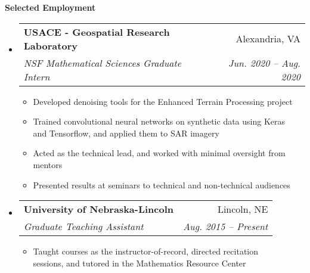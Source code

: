 \documentclass[letterpaper,11pt]{article}
\makeatletter
\newcommand{\resitem}[1]{\item #1 \vspace{-2pt}}
\newcommand{\resheading}[1]{{\large \colorbox{mygrey}{\begin{minipage}{\textwidth}{\textbf{#1 \vphantom{p\^{E}}}}\end{minipage}}}}
\newcommand{\ressubheading}[4]{
\begin{tabular*}{6.5in}{l@{\extracolsep{\fill}}r}
		\textbf{#1} & #2 \\
		\textit{#3} & \textit{#4} \\
\end{tabular*}\vspace{-6pt}}
\makeatother
\begin{document}
\resheading{Selected Employment}
	\begin{itemize}
				\item
		\ressubheading{USACE - Geospatial Research Laboratory}{Alexandria, VA}{NSF Mathematical Sciences Graduate Intern}{Jun. 2020 -- Aug. 2020}
		{\footnotesize
			\begin{itemize}
				\resitem{Developed denoising tools for the Enhanced Terrain Processing project}
				\resitem{Trained convolutional neural networks on synthetic data using Keras \\ and Tensorflow, and applied them to SAR imagery}
				\resitem{Acted as the technical lead, and worked with minimal oversight from mentors}
				\resitem{Presented results at seminars to technical and non-technical audiences}
		\end{itemize}}
	
		\item
			\ressubheading{University of Nebraska-Lincoln}{Lincoln, NE}{Graduate Teaching Assistant}{Aug. 2015 -- Present}
				{ \footnotesize
				\begin{itemize}
					\resitem{Taught courses as the instructor-of-record, directed recitation \\ sessions, and tutored in the Mathematics Resource Center}
				\end{itemize}}


\end{itemize}
\end{document}
